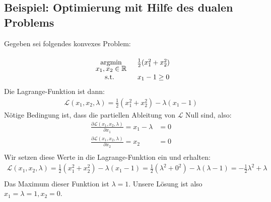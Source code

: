\documentclass{report}
\newcommand{\argmin}[1] {
    \begin{array}{c}
        \vphantom{#1}\\[-3pt] %
        \text{argmin}\\[-3pt]
        #1\\
        \end{array}
    }
\newcommand{\pd}[2]{\frac{\partial #1}{\partial #2}}
\begin{document}
%
%
%
\subsection{Beispiel: Optimierung mit Hilfe des dualen Problems}
Gegeben sei folgendes konvexes Problem:
\begin{align*}
\begin{array}{cc}
\argmin{x_1, x_2 \in \mathbb{R}} &\frac{1}{2} (x_1^2 + x_2^2)\\
 \text{s.t. } &x_1 - 1 \geq 0\\
\end{array}
\end{align*}
Die Lagrange-Funktion ist dann:
\begin{align*}
 \mathcal{L}(x_1, x_2, \lambda) = \frac{1}{2} (x_1^2 + x_2^2) - \lambda(x_1 - 1)
\end{align*}
Nötige Bedingung ist, dass die partiellen Ableitung von $\mathcal{L}$ Null sind, also:
\begin{align*}
 \pd{\mathcal{L}(x_1, x_2, \lambda)}{x_1} = x_1 - \lambda &= 0\\
 \pd{\mathcal{L}(x_1, x_2, \lambda)}{x_2} =x_2 &= 0\\
\end{align*}
Wir setzen diese Werte in die Lagrange-Funktion ein und erhalten:
\begin{align*}
 \mathcal{L}(x_1, x_2, \lambda) = \frac{1}{2} (x_1^2 + x_2^2) - \lambda(x_1 - 1) = \frac{1}{2} (\lambda^2 + 0^2) - \lambda(\lambda - 1) = -\frac{1}{2}\lambda^2 + \lambda\\
\end{align*}
Das Maximum dieser Funktion ist $\lambda = 1$. Unsere Lösung ist also $x_1 = \lambda = 1, x_2 = 0$.
%
%
%
\end{document}
